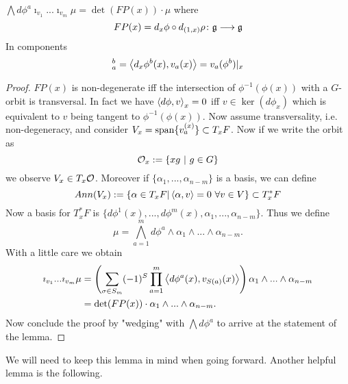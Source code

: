 \begin{lem}
  $\bigwedge d\phi^a \imath_{v_1} ... \imath_{v_m} \mu = \det(FP(x)) \cdot \mu$ where
  \begin{equation}
    FP(x) = d_x \phi \circ d_{(1,x)} \rho \colon \gf \lra \gf
  \end{equation}
  In components
  \begin{equation}
    [FP(x)]^b_a = \pair{d_x\phi^b(x)}{v_a(x)} = v_a (\phi^b)|_x
  \end{equation}
\begin{proof}
  $FP(x)$ is non-degenerate iff the intersection of $\phi^{-1}(\phi(x))$ with a $G$-orbit is transversal. In fact we have $\pair{d\phi}{v}_x = 0$ iff $v \in \ker(d\phi_x)$ which is equivalent to $v$ being tangent to $\phi^{-1}(\phi(x))$. Now assume transversality, i.e. non-degeneracy, and consider $V_x = \operatorname{span}\{v_a^{(x)}\} \subset T_x F$. Now if we write the orbit as
  \begin{equation}
    \mathcal{O}_x := \{xg \ | \ g \in G \}
  \end{equation}
  we observe $V_x \in T_x \mathcal{O}$. Moreover if $\{\alpha_1, ..., \alpha_{n-m}\}$ is a basis, we can define
  \begin{equation}
    Ann(V_x) := \{ \alpha \in T_x F | \left\langle \alpha , v \right\rangle = 0 \ \forall v \in V \} \subset T^*_x F
  \end{equation}
  Now a basis for $T^*_x F$ is $\{d\phi^1(x), ..., d\phi^m(x), \alpha_1, ..., \alpha_{n-m} \}$. Thus we define
  \begin{equation}
    \mu = \bigwedge_{a=1}^m d\phi^a  \wedge \alpha_1 \wedge ... \wedge \alpha_{n-m}.
  \end{equation}
  With a little care we obtain
  \begin{align}
    \imath_{v_1} ... \imath_{v_m} \mu &= \left( \sum_{\sigma \in S_m} (-1)^S \prod_{a = 1}^m \pair{d\phi^a(x)}{v_{S(a)}(x)} \right) \alpha_1 \wedge ... \wedge \alpha_{n-m}\\
    &= \det(FP(x)) \cdot \alpha_1 \wedge ... \wedge \alpha_{n-m}.
  \end{align}
  Now conclude the proof by "wedging" with $\bigwedge d\phi^a$ to arrive at the statement of the lemma.
\end{proof}
\end{lem}

We will need to keep this lemma in mind when going forward. Another helpful lemma is the following.

